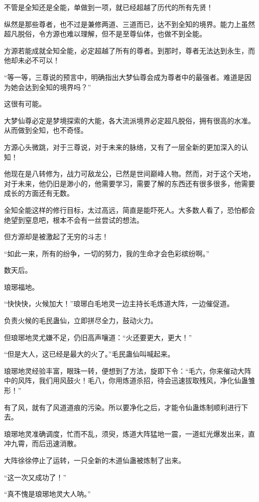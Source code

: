 \begin{this_body}
不管是全知还是全能，单做到一项，就已经超越了历代的所有先贤！

纵然是那些尊者，也不过是兼修两道、三道而已，达不到全知的境界。能力上虽然超凡脱俗，令方源也难以理解，但不是至尊仙体，也做不到全能。

方源若能成就全知全能，必定超越了所有的尊者。到那时，尊者无法达到永生，而他却未必不可以！

“等一等，三尊说的预言中，明确指出大梦仙尊会成为尊者中的最强者。难道是因为她会达到全知的境界吗？”

这很有可能。

大梦仙尊必定是梦境探索的大能，各大流派境界必定超凡脱俗，拥有很高的水准。从而做到全知，也不奇怪。

方源心头微跳，对于三尊说，对于未来的脉络，又有了一层全新的更加深入的认知！

他现在是八转修为，战力可敌龙公，已然是世间巅峰人物。然而，对于这个天地，对于未来，他仍旧是渺小的，他需要学习，需要了解的东西还有很多很多，他需要成长的方面还有无数。

全知全能这样的修行目标，太过高远，简直是能吓死人。大多数人看了，恐怕都会绝望到窒息吧，根本不会有一丝尝试的想法。

但方源却是被激起了无穷的斗志！

“如此一来，所有的纷争，一切的努力，我的生命才会色彩缤纷啊。”

数天后。

琅琊福地。

“快快快，火候加大！”琅琊白毛地灵一边主持长毛炼道大阵，一边催促道。

负责火候的毛民蛊仙，立即拼尽全力，鼓动火力。

但琅琊地灵尤嫌不足，仍旧高声嚷道：“火还要更大，更大！”

“但是大人，这已经是最大的火了。”毛民蛊仙叫喊起来。

琅琊地灵经验丰富，眼珠一转，便想到了方法，旋即下令：“毛六，你来催动大阵中的风阵，我们用风鼓火！毛八，你用炼道杀招，待会迅速拔取残风，净化仙蛊雏形！”

有了风，就有了风道道痕的污染。所以要净化之后，才能令仙蛊炼制顺利进行下去。

琅琊地灵准确调度，忙而不乱，须臾，炼道大阵猛地一震，一道虹光爆发出来，直冲九霄，而后迅速消散。

大阵徐徐停止了运转，一只全新的木道仙蛊被炼制了出来。

“这一次又成功了！”

“真不愧是琅琊地灵大人呐。”


\end{this_body}
